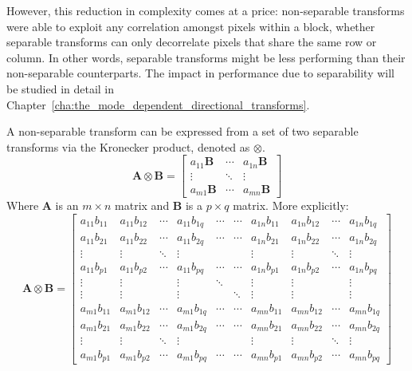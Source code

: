 \documentclass[11pt,a4paper,openright,twoside]{book}
\numberwithin{equation}{section} %
\numberwithin{figure}{section} %
\numberwithin{table}{section} %
\begin{document}
However, this reduction in complexity comes at a price: non-separable
transforms were able to exploit any correlation amongst pixels within a
block, whether separable transforms can only decorrelate pixels that
share the same row or column.
In other words, separable transforms might be less performing than their
non-separable counterparts.
The impact in performance due to separability will be studied in detail
in Chapter~\ref{cha:the_mode_dependent_directional_transforms}.

A non-separable transform can be expressed from a set of two separable
transforms via the Kronecker product, denoted as $\otimes$.
\begin{equation}
	\mathbf{A}\otimes\mathbf{B} = 
	\begin{bmatrix}
		a_{11} \mathbf{B} & \cdots & a_{1n}\mathbf{B} \\
		\vdots & \ddots & \vdots \\
		a_{m1} \mathbf{B} & \cdots & a_{mn} \mathbf{B}
	\end{bmatrix}
\end{equation}
Where $\mathbf{A}$ is an $m \times n$ matrix and $\mathbf{B}$ is a $p \times
q$ matrix.
More explicitly:
\begin{equation}
	\mathbf{A}\otimes\mathbf{B} =
	\begin{bmatrix}
		a_{11} b_{11} & a_{11} b_{12} & \cdots & a_{11} b_{1q} & \cdots & \cdots & a_{1n} b_{11} & a_{1n} b_{12} & \cdots & a_{1n} b_{1q} \\
		a_{11} b_{21} & a_{11} b_{22} & \cdots & a_{11} b_{2q} & \cdots & \cdots & a_{1n} b_{21} & a_{1n} b_{22} & \cdots & a_{1n} b_{2q} \\
		\vdots & \vdots & \ddots & \vdots & & & \vdots & \vdots & \ddots & \vdots \\
		a_{11} b_{p1} & a_{11} b_{p2} & \cdots & a_{11} b_{pq} & \cdots & \cdots & a_{1n} b_{p1} & a_{1n} b_{p2} & \cdots & a_{1n} b_{pq} \\
		\vdots & \vdots & & \vdots & \ddots & & \vdots & \vdots & & \vdots \\
		\vdots & \vdots & & \vdots & & \ddots & \vdots & \vdots & & \vdots \\
		a_{m1} b_{11} & a_{m1} b_{12} & \cdots & a_{m1} b_{1q} & \cdots & \cdots & a_{mn} b_{11} & a_{mn} b_{12} & \cdots & a_{mn} b_{1q} \\
		a_{m1} b_{21} & a_{m1} b_{22} & \cdots & a_{m1} b_{2q} & \cdots & \cdots & a_{mn} b_{21} & a_{mn} b_{22} & \cdots & a_{mn} b_{2q} \\
		\vdots & \vdots & \ddots & \vdots & & & \vdots & \vdots & \ddots & \vdots \\
		a_{m1} b_{p1} & a_{m1} b_{p2} & \cdots & a_{m1} b_{pq} & \cdots & \cdots & a_{mn} b_{p1} & a_{mn} b_{p2} & \cdots & a_{mn} b_{pq} 
	\end{bmatrix}
\end{equation}
\end{document}
